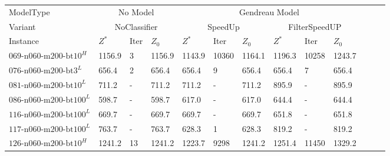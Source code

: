 \begin{landscape}
	\begin{table}
		\centering
		\tiny
		\begin{tabular}{llllllllllrrr}
			\toprule
			ModelType                      & \multicolumn{3}{c}{No Model}     & \multicolumn{6}{c}{Gendreau Model}                                                                                         \\\cmidrule(lr){2-4}\cmidrule(lr){5-10}
			Variant                        & \multicolumn{3}{c}{NoClassifier} & \multicolumn{3}{c}{SpeedUp}        & \multicolumn{3}{c}{FilterSpeedUP}                                                     \\\cmidrule(lr){2-4}\cmidrule(lr){5-7}\cmidrule(lr){8-10}
			Instance                       & $Z^*$                            & Iter                               & $Z_0$                             & $Z^*$  & Iter  & $Z_0$  & $Z^*$  & Iter  & $Z_0$  \\
			\midrule
			$\text{069-n060-m200-bt10}^H$  & 1156.9                           & 3                                  & 1156.9                            & 1143.9 & 10360 & 1164.1 & 1196.3 & 10258 & 1243.7 \\
			$\text{076-n060-m200-bt3}^L$   & 656.4                            & 2                                  & 656.4                             & 656.4  & 9     & 656.4  & 656.4  & 7     & 656.4  \\
			$\text{081-n060-m200-bt10}^L$  & 711.2                            & -                                  & 711.2                             & 711.2  & -     & 711.2  & 895.9  & -     & 895.9  \\
			$\text{086-n060-m200-bt100}^L$ & 598.7                            & -                                  & 598.7                             & 617.0  & -     & 617.0  & 644.4  & -     & 644.4  \\
			$\text{116-n060-m200-bt100}^L$ & 669.7                            & -                                  & 669.7                             & 669.7  & -     & 669.7  & 651.8  & -     & 651.8  \\
			$\text{117-n060-m200-bt100}^L$ & 763.7                            & -                                  & 763.7                             & 628.3  & 1     & 628.3  & 819.2  & -     & 819.2  \\
			$\text{126-n060-m200-bt10}^H$  & 1241.2                           & 13                                 & 1241.2                            & 1223.7 & 9298  & 1241.2 & 1251.4 & 11450 & 1329.2 \\

\end{tabular}
\end{table}
\end{landscape}
